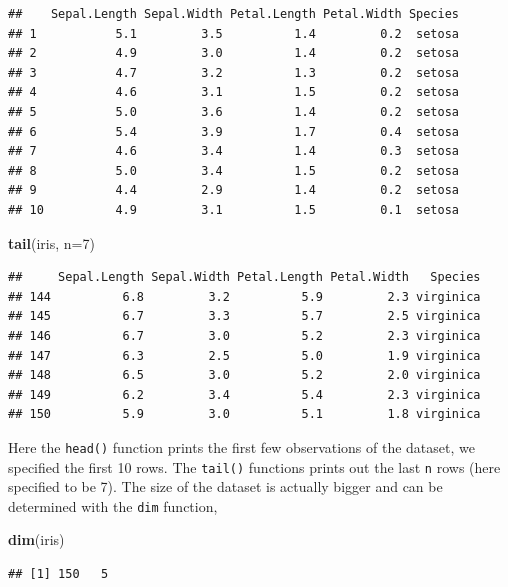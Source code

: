 \documentclass[
]{book}
\newenvironment{Shaded}{\begin{snugshade}}{\end{snugshade}}
\newcommand{\AttributeTok}[1]{\textcolor[rgb]{0.13,0.29,0.53}{#1}}
\newcommand{\DecValTok}[1]{\textcolor[rgb]{0.00,0.00,0.81}{#1}}
\newcommand{\FunctionTok}[1]{\textcolor[rgb]{0.13,0.29,0.53}{\textbf{#1}}}
\newcommand{\NormalTok}[1]{#1}
\begin{document}
\begin{verbatim}
##    Sepal.Length Sepal.Width Petal.Length Petal.Width Species
## 1           5.1         3.5          1.4         0.2  setosa
## 2           4.9         3.0          1.4         0.2  setosa
## 3           4.7         3.2          1.3         0.2  setosa
## 4           4.6         3.1          1.5         0.2  setosa
## 5           5.0         3.6          1.4         0.2  setosa
## 6           5.4         3.9          1.7         0.4  setosa
## 7           4.6         3.4          1.4         0.3  setosa
## 8           5.0         3.4          1.5         0.2  setosa
## 9           4.4         2.9          1.4         0.2  setosa
## 10          4.9         3.1          1.5         0.1  setosa
\end{verbatim}

\begin{Shaded}
\begin{Highlighting}[]
\FunctionTok{tail}\NormalTok{(iris, }\AttributeTok{n=}\DecValTok{7}\NormalTok{)}
\end{Highlighting}
\end{Shaded}

\begin{verbatim}
##     Sepal.Length Sepal.Width Petal.Length Petal.Width   Species
## 144          6.8         3.2          5.9         2.3 virginica
## 145          6.7         3.3          5.7         2.5 virginica
## 146          6.7         3.0          5.2         2.3 virginica
## 147          6.3         2.5          5.0         1.9 virginica
## 148          6.5         3.0          5.2         2.0 virginica
## 149          6.2         3.4          5.4         2.3 virginica
## 150          5.9         3.0          5.1         1.8 virginica
\end{verbatim}

Here the \texttt{head()} function prints the first few observations of the dataset, we specified the first 10 rows. The \texttt{tail()} functions prints out the last \texttt{n} rows (here specified to be 7). The size of the dataset is actually bigger and can be determined with the \texttt{dim} function,

\begin{Shaded}
\begin{Highlighting}[]
\FunctionTok{dim}\NormalTok{(iris)}
\end{Highlighting}
\end{Shaded}

\begin{verbatim}
## [1] 150   5
\end{verbatim}
\end{document}
